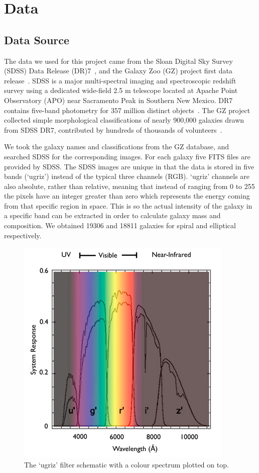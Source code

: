 \section{Data}
\label{sec:data}
\subsection{Data Source}
\label{sec:data_source}
The data we used for this project came from the Sloan Digital Sky Survey (SDSS) Data Release (DR)7~\cite{abazajian2009seventh}, and the Galaxy Zoo (GZ) project first data release~\cite{lintott2010galaxy}. 
SDSS is a major multi-spectral imaging and spectroscopic redshift survey using a dedicated wide-field 2.5 m telescope located at Apache Point Observatory (APO) near Sacramento Peak in Southern New Mexico.
DR7 contains five-band photometry for 357 million distinct objects~\cite{abazajian2009seventh}. 
The GZ project collected simple morphological classifications of nearly 900,000 galaxies drawn from SDSS DR7, contributed by hundreds of thousands of volunteers~\cite{lintott2010galaxy}. 

We took the galaxy names and classifications from the GZ database, and searched SDSS for the corresponding images. 
For each galaxy five FITS files are provided by SDSS.
The SDSS images are unique in that the data is stored in five bands (`ugriz') instead of the typical three channels (RGB). 
`ugriz' channels are also absolute, rather than relative, meaning that instead of ranging from 0 to 255 the pixels have an integer greater than zero which represents the energy coming from that specific region in space. 
This is so the actual intensity of the galaxy in a specific band can be extracted in order to calculate galaxy mass and composition.
We obtained 19306 and 18811 galaxies for spiral and elliptical respectively. 

\begin{figure}[h!]
	\centering
	\captionsetup{justification=centering}
	\includegraphics[scale=0.5]{Figures/filters.jpg}
	\caption{The `ugriz' filter schematic with a colour spectrum plotted on top.}
	\label{fig:filters}
\end{figure}



